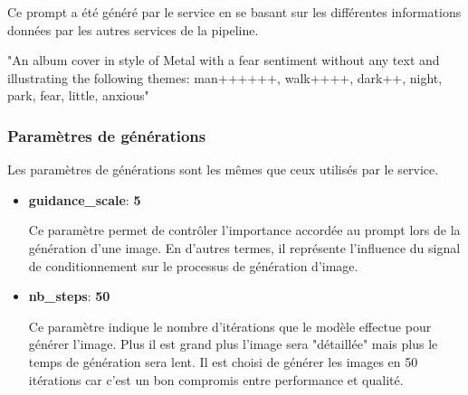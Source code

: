 Ce prompt a été généré par le service en se basant sur les différentes informations données par les autres services de la pipeline.

"An album cover in style of Metal with a fear sentiment without any text and illustrating the following themes: man++++++, walk++++, dark++, night, park, fear, little, anxious"

\subsubsection*{Paramètres de générations}
Les paramètres de générations sont les mêmes que ceux utilisés par le service.
\begin{itemize}
    \item \textbf{guidance\_scale}: \textbf{5} 
    
    Ce paramètre permet de contrôler l'importance accordée au prompt lors de la génération d'une image. En d'autres termes, il représente l'influence du signal de conditionnement sur le processus de génération d'image. 
    \item \textbf{nb\_steps}: \textbf{50}

    Ce paramètre indique le nombre d'itérations que le modèle effectue pour générer l'image. Plus il est grand plus l'image sera "détaillée" mais plus le temps de génération sera lent. Il est choisi de générer les images en 50 itérations car c'est un bon compromis entre performance et qualité.
\end{itemize}





